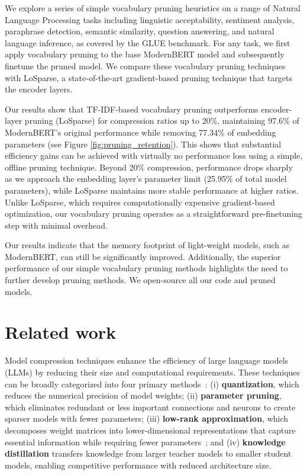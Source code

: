 \documentclass[twocolumn]{article}
\begin{document}
We explore a series of simple vocabulary pruning heuristics on a range of Natural Language Processing tasks including linguistic acceptability, sentiment analysis, paraphrase detection, semantic similarity, question answering, and natural language inference, as covered by the GLUE benchmark. For any task, we first apply vocabulary pruning to the base ModernBERT model and subsequently finetune the pruned model. We compare these vocabulary pruning techniques with LoSparse, a state-of-the-art gradient-based pruning technique that targets the encoder layers.

Our results show that TF-IDF-based vocabulary pruning outperforms encoder-layer pruning (LoSparse) for compression ratios up to 20\%, maintaining 97.6\% of ModernBERT's original performance while removing 77.34\% of embedding parameters (see Figure \ref{fig:pruning_retention}). This shows that substantial efficiency gains can be achieved with virtually no performance loss using a simple, offline pruning technique. Beyond 20\% compression, performance drops sharply as we approach the embedding layer's parameter limit (25.95\% of total model parameters), while LoSparse maintains more stable performance at higher ratios. Unlike LoSparse, which requires computationally expensive gradient-based optimization, our vocabulary pruning operates as a straightforward pre-finetuning step with minimal overhead.

Our results indicate that the memory footprint of light-weight models, such as ModernBERT, can still be significantly improved. Additionally, the superior performance of our simple vocabulary pruning methods highlights the need to further develop pruning methods. We open-source all our code and pruned models.

\section{Related work}
Model compression techniques enhance the efficiency of large language models (LLMs) by reducing their size and computational requirements.
% 
These techniques can be broadly categorized into four primary methods~\cite{wan2023efficient}:
(i) \textbf{quantization}, which reduces the numerical precision of model weights;
(ii) \textbf{parameter pruning}, which eliminates redundant or less important connections and neurons to create sparser models with fewer parameters;
(iii) \textbf{low-rank approximation}, which decomposes weight matrices into lower-dimensional representations that capture essential information while requiring fewer parameters~\cite{Hu2021LoRA}; and
(iv) \textbf{knowledge distillation} transfers knowledge from larger teacher models to smaller student models, enabling competitive performance with reduced architecture size.~\cite{Hinton2015Distillation}
\end{document}
